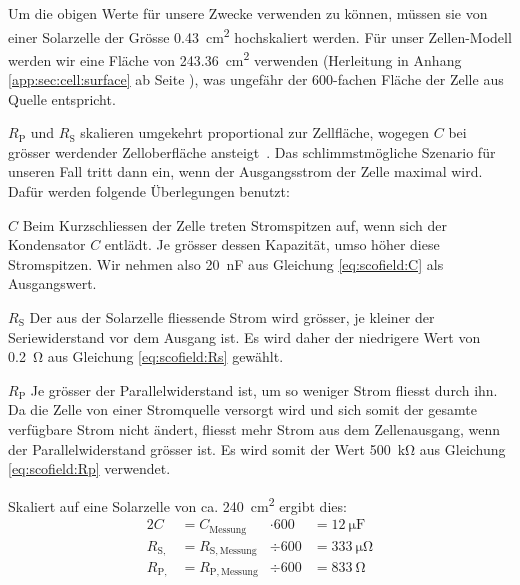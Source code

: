 Um  die obigen  Werte  f\"ur  unsere Zwecke  verwenden  zu k\"onnen,  m\"ussen
sie   von  einer   Solarzelle  der   Gr\"osse  \SI{0.43}{\centi\meter\squared}
hochskaliert    werden. F\"ur   unser    Zellen-Modell    werden   wir    eine
Fl\"ache  von   \SI{243.36}{\centi\meter\squared}  verwenden   (Herleitung  in
Anhang  \ref{app:sec:cell:surface}  ab Seite  \pageref{app:sec:cell:surface}),
was   ungef\"ahr    der   600-fachen    Fl\"ache   der   Zelle    aus   Quelle
\cite{ref:solar:scofield} entspricht.

$R_{\mathrm{P}}$   und  $R_{\mathrm{S}}$   skalieren  umgekehrt   proportional
zur  Zellfl\"ache,  wogegen  $C$   bei  gr\"osser  werdender  Zelloberfl\"ache
ansteigt~\cite{ref:solar:scofield}. Das  schlimmstm\"ogliche   Szenario  f\"ur
unseren  Fall  tritt  dann  ein,  wenn der  Ausgangsstrom  der  Zelle  maximal
wird. Daf\"ur werden folgende \"Uberlegungen benutzt:

\begin{symbols}
    \firmlist
    \item[$C$]
        Beim Kurzschliessen der  Zelle treten Stromspitzen auf,  wenn sich der
        Kondensator  $C$  entl\"adt. Je  gr\"osser  dessen  Kapazit\"at,  umso
        h\"oher diese Stromspitzen.  Wir  nehmen also \SI{20}{\nano\farad} aus
        Gleichung \ref{eq:scofield:C} als Ausgangswert.
    \item[$R_{\mathrm{S}}$]
        Der aus der Solarzelle fliessende Strom wird gr\"osser, je kleiner der
        Seriewiderstand vor dem Ausgang ist. Es wird daher der niedrigere Wert
        von \SI{0.2}{\ohm} aus Gleichung \ref{eq:scofield:Rs} gew\"ahlt.
    \item[$R_{\mathrm{P}}$]
        Je gr\"osser der  Parallelwiderstand ist, um so  weniger Strom fliesst
        durch ihn. Da die  Zelle von einer Stromquelle versorgt  wird und sich
        somit  der gesamte  verf\"ugbare  Strom nicht  \"andert, fliesst  mehr
        Strom  aus dem  Zellenausgang, wenn  der Parallelwiderstand  gr\"osser
        ist. Es  wird   somit  der  Wert  \SI{500}{\kilo\ohm}   aus  Gleichung
        \ref{eq:scofield:Rp} verwendet.
\end{symbols}

Skaliert auf eine Solarzelle von ca. \SI{240}{\centi\meter\squared} ergibt dies:
\begin{alignat}{2}
    C               &= C_{\mathrm{Messung}}    &\cdot 600 &= \SI{12}{\micro\farad} \\
    R_{\mathrm{S,}} &= R_{\mathrm{S, Messung}} &\div  600 &= \SI{333}{\micro\ohm}    \\
    R_{\mathrm{P,}} &= R_{\mathrm{P, Messung}} &\div  600 &= \SI{833}{\ohm}
\end{alignat}

